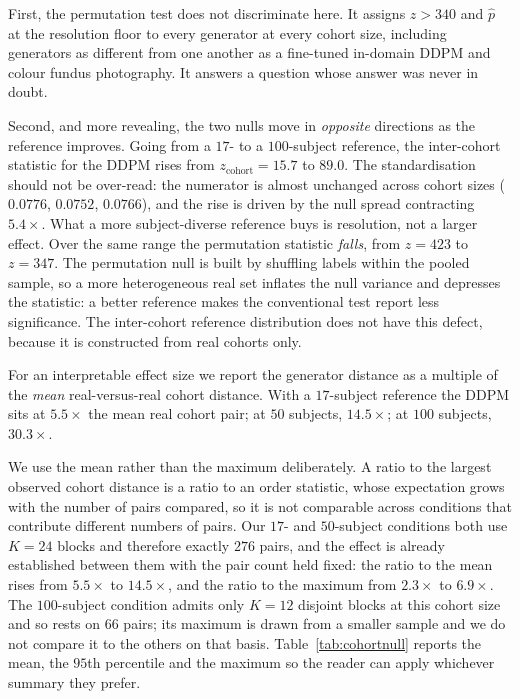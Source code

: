 \documentclass[preprint,12pt,authoryear]{elsarticle}
\begin{document}
First, the permutation test does not discriminate here. It assigns $z > 340$ and
$\hat{p}$ at the resolution floor to every generator at every cohort size,
including generators as different from one another as a fine-tuned in-domain
DDPM and colour fundus photography. It answers a question whose answer was
never in doubt.

Second, and more revealing, the two nulls move in \emph{opposite} directions as
the reference improves. Going from a $17$- to a $100$-subject reference, the
inter-cohort statistic for the DDPM rises from $z_{\mathrm{cohort}} = 15.7$
to $89.0$. The standardisation should not be over-read: the numerator is
almost unchanged across cohort sizes ($0.0776$, $0.0752$, $0.0766$), and the
rise is driven by the null spread contracting $5.4\times$. What a more
subject-diverse reference buys is resolution, not a larger effect. Over the same range the permutation statistic
\emph{falls}, from $z = 423$ to $z = 347$. The permutation null is built by
shuffling labels within the pooled sample, so a more heterogeneous real set
inflates the null variance and depresses the statistic: a better reference
makes the conventional test report less significance. The inter-cohort reference
distribution does not have this defect, because it is constructed from real
cohorts only.

For an interpretable effect size we report the generator distance as a multiple
of the \emph{mean} real-versus-real cohort distance. With a $17$-subject
reference the DDPM sits at $5.5\times$ the mean real cohort pair; at $50$
subjects, $14.5\times$; at $100$ subjects, $30.3\times$.

We use the mean rather than the maximum deliberately. A ratio to the largest
observed cohort distance is a ratio to an order statistic, whose expectation
grows with the number of pairs compared, so it is not comparable across
conditions that contribute different numbers of pairs. Our $17$- and
$50$-subject conditions both use $K = 24$ blocks and therefore exactly $276$
pairs, and the effect is already established between them with the pair count
held fixed: the ratio to the mean rises from $5.5\times$ to $14.5\times$, and
the ratio to the maximum from $2.3\times$ to $6.9\times$. The $100$-subject
condition admits only $K = 12$ disjoint blocks at this cohort size and so rests
on $66$ pairs; its maximum is drawn from a smaller sample and we do not compare
it to the others on that basis. Table~\ref{tab:cohortnull} reports the mean,
the $95$th percentile and the maximum so the reader can apply whichever
summary they prefer.
\end{document}
